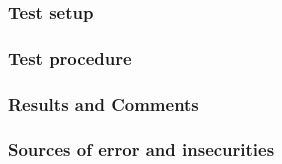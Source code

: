 \subsubsection{Test setup}


\subsubsection{Test procedure}
%
%


\subsubsection{Results and Comments}

%
%
%
%
%
%
\subsubsection{Sources of error and insecurities}
